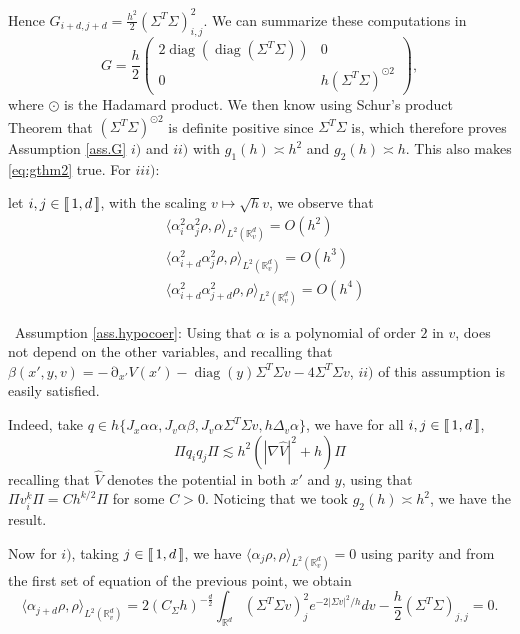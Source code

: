 \documentclass[12pt]{amsart}
\newcommand{\diag}{\operatorname{diag}}
\newcommand{\R}{\mathbb R}
\def\<{\langle}
\def\>{\rangle}
\numberwithin{equation}{section}
\numberwithin{figure}{section}
\DeclareMathOperator{\p}{\partial}
\newcommand{\lb}{\operatorname{[\negthinspace [}}
\newcommand{\rb}{\operatorname{]\negthinspace ]}}
\begin{document}
Hence $G_{i+d,j+d} = \frac{h^2}{2}(\Sigma^T\Sigma)_{i,j}^2$. We can summarize these computations in
\begin{equation*}
G = \frac h2\left(\begin{array}{c|c}
    2\diag(\diag(\Sigma^T\Sigma)) & 0 \\
    \hline
    0 & h(\Sigma^T\Sigma)^{\odot 2}
\end{array}\right),
\end{equation*}
where $\odot$ is the Hadamard product. We then know using Schur's product Theorem \cite[Theorem VII]{Sc11} that $(\Sigma^T\Sigma)^{\odot 2}$ is definite positive since $\Sigma^T\Sigma$ is, which therefore proves Assumption \ref{ass.G} $i)$ and $ii)$ with $g_1(h)\asymp h^2$ and $g_2(h)\asymp h$. This also makes \eqref{eq:gthm2} true. For $iii)$:

let $i,j\in\lb1,d\rb$, with the scaling $v\mapsto\sqrt{h}v$, we observe that
\begin{equation*}
\begin{aligned}
    &\<\alpha_i^2\alpha_j^2\rho,\rho\>_{L^2(\R^d_v)} = O(h^2)\\
    &\<\alpha_{i+d}^2\alpha_j^2\rho,\rho\>_{L^2(\R^d_v)} = O(h^3)\\
    &\<\alpha_{i+d}^2\alpha_{j+d}^2\rho,\rho\>_{L^2(\R^d_v)} = O(h^4)
\end{aligned}
\end{equation*}

\textbullet\ Assumption \ref{ass.hypocoer}: Using that $\alpha$ is a polynomial of order $2$ in $v$, does not depend on the other variables, and recalling that $\beta(x',y,v) = -\p_{x'}V(x') - \diag(y)\Sigma^T\Sigma v - 4\Sigma^T\Sigma v$, $ii)$ of this assumption is easily satisfied.

Indeed, take $q\in h\{J_x\alpha\alpha,J_v\alpha\beta,J_v\alpha\Sigma^T\Sigma v,h\Delta_v\alpha\}$, we have for all $i,j\in\lb1,d\rb$,
\begin{equation*}
\Pi q_iq_j\Pi \lesssim h^2(|\nabla \hat V|^2 + h)\Pi
\end{equation*}
recalling that $\hat V$ denotes the potential in both $x'$ and $y$, using that $\Pi v_i^k\Pi = Ch^{k/2}\Pi$ for some $C>0$. Noticing that we took $g_2(h)\asymp h^2$, we have the result.

Now for $i)$, taking $j\in\lb1,d\rb$, we have $\<\alpha_j\rho,\rho\>_{L^2(\R^d_v)} = 0$ using parity and from the first set of equation of the previous point, we obtain
\begin{equation*}
\<\alpha_{j+d}\rho,\rho\>_{L^2(\R^d_v)} = 2(C_\Sigma h)^{-\frac d2}\int_{\R^d}(\Sigma^T\Sigma v)_j^2e^{-2|\Sigma v|^2/h}dv - \frac{h}{2}(\Sigma^T\Sigma)_{j,j} = 0.
\end{equation*}
\end{document}
